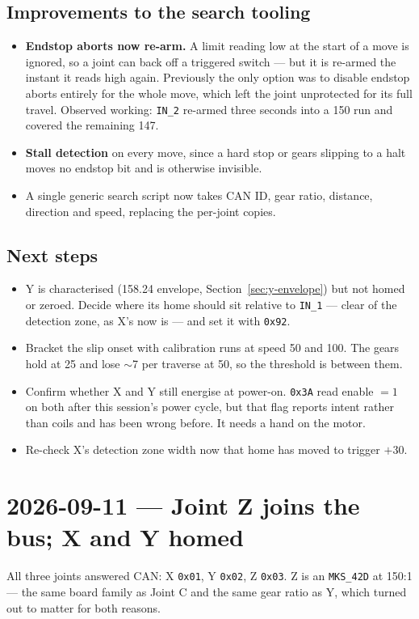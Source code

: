 \documentclass[11pt,letterpaper]{article}
\begin{document}
\subsection{Improvements to the search tooling}
\begin{itemize}
    \item \textbf{Endstop aborts now re-arm.} A limit reading low at the start of
    a move is ignored, so a joint can back off a triggered switch --- but it is
    re-armed the instant it reads high again. Previously the only option was to
    disable endstop aborts entirely for the whole move, which left the joint
    unprotected for its full travel. Observed working: \texttt{IN\_2} re-armed
    three seconds into a 150\textdegree{} run and covered the remaining
    147\textdegree{}.
    \item \textbf{Stall detection} on every move, since a hard stop or gears
    slipping to a halt moves no endstop bit and is otherwise invisible.
    \item A single generic search script now takes CAN ID, gear ratio, distance,
    direction and speed, replacing the per-joint copies.
\end{itemize}

\subsection{Next steps}
\begin{itemize}
    \item Y is characterised (158.24\textdegree{} envelope,
    Section~\ref{sec:y-envelope}) but not homed or zeroed. Decide where its home
    should sit relative to \texttt{IN\_1} --- clear of the detection zone, as X's
    now is --- and set it with \texttt{0x92}.
    \item Bracket the slip onset with calibration runs at speed 50 and 100. The
    gears hold at 25 and lose $\sim$7\textdegree{} per traverse at 50, so the
    threshold is between them.
    \item Confirm whether X and Y still energise at power-on. \texttt{0x3A} read
    enable $=1$ on both after this session's power cycle, but that flag reports
    intent rather than coils and has been wrong before. It needs a hand on the
    motor.
    \item Re-check X's detection zone width now that home has moved to trigger
    $+30$\textdegree{}.
\end{itemize}

\section{2026-09-11 --- Joint Z joins the bus; X and Y homed}
\label{sec:session-2026-09-11}
All three joints answered CAN: X \texttt{0x01}, Y \texttt{0x02}, Z \texttt{0x03}.
Z is an \texttt{MKS\_42D} at 150:1 --- the same board family as Joint C and the
same gear ratio as Y, which turned out to matter for both reasons.
\end{document}
